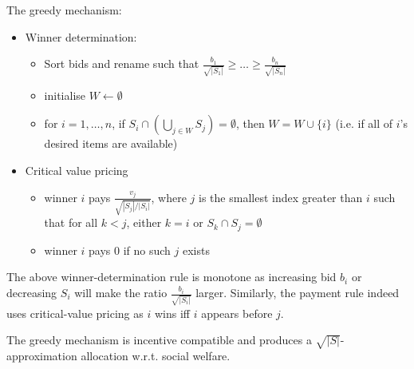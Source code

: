 The greedy mechanism:
\begin{itemize}
	\item Winner determination:
		\begin{itemize}
			\item Sort bids and rename such that
				$\frac{b_1}{\sqrt{|S_1|}} \ge \ldots \ge
				\frac{b_n}{\sqrt{|S_n|}}$
			\item initialise $W \leftarrow \emptyset$
			\item for $i = 1, \ldots, n$, if $S_i \cap (\bigcup_{j \in W} S_j)
				= \emptyset$, then $W = W \cup \{i\}$ (i.e. if all
				of $i$'s desired items are available)
		\end{itemize}
	\item Critical value pricing
		\begin{itemize}
			\item winner $i$ pays $\frac{v_j}{\sqrt{|S_j|/|S_i|}}$,
				where $j$ is the smallest index greater than $i$ such
				that for all $k < j$, either $k=i$ or $S_k \cap S_j =
				\emptyset$
			\item winner $i$ pays 0 if no such $j$ exists
		\end{itemize}
\end{itemize}

The above winner-determination rule is monotone as increasing bid $b_i$ or
decreasing $S_i$ will make the ratio $\frac{b_i}{\sqrt{|S_i|}}$ larger.
Similarly, the payment rule indeed uses critical-value pricing as $i$ wins iff
$i$ appears before $j$.

\begin{theorem}
	The greedy mechanism is incentive compatible and produces a
	$\sqrt{|S|}$-approximation allocation w.r.t. social welfare.
\end{theorem}

